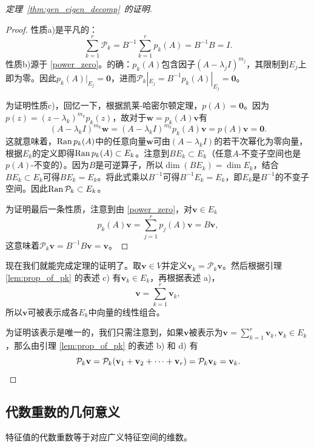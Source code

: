 \begin{proof}[定理~\ref{thm:gen_eigen_decomp}~的证明]
\begin{proof} 
    性质a)是平凡的：\[\sum_{k=1}^r\mathcal{P}_k=B^{-1}\sum_{k=1}^rp_k(A)=B^{-1}B=I.\]
    性质b)源于 \eqref{power_zero}。的确：$p_k(A)$包含因子$(A-\lambda_j I)^{m_j}$，其限制到$E_j$上即为零。因此$p_k(A)|_{E_j}=\mathbf{0}$，进而$\mathcal{P}_k|_{E_j}=B^{-1}p_k(A)|_{E_j}=\mathbf{0}$。

    为证明性质c)，回忆一下，根据凯莱-哈密尔顿定理，$p(A)=\mathbf{0}$。因为$p(z)=(z-\lambda_k)^{m_k}p_k(z)$，故对于$\mathbf{w}=p_k(A)\mathbf{v}$有
    \[(A-\lambda_kI)^{m_k}\mathbf{w}=(A-\lambda_kI)^{m_k}p_k(A)\mathbf{v}=p(A)\mathbf{v}=\mathbf{0}.\]
    这就意味着，$\operatorname{Ran} p_k(A)$中的任意向量$\mathbf{w}$可由$(A-\lambda_k I)$的若干次幂化为零向量，根据$E_k$的定义即得$\operatorname{Ran} p_k(A)\subset E_k$。注意到$BE_k\subset E_k$（任意$A$-不变子空间也是$p(A)$-不变的）。因为$B$是可逆算子，所以$\dim(BE_k)=\dim E_k$，结合$BE_k\subset E_k$可得$BE_k= E_k$。将此式乘以$B^{-1}$可得$B^{-1}E_k=E_k$，即$E_k$是$B^{-1}$的不变子空间。因此$\operatorname{Ran} \mathcal{P}_k\subset E_k$。

    为证明最后一条性质，注意到由 \eqref{power_zero}，对$\mathbf{v}\in E_k$
    \[p_k(A)\mathbf{v}=\sum_{j=1}^{r}p_{j}(A)\mathbf{v}=B\mathbf{v},\]
    这意味着$\mathcal{P}_k\mathbf{v}=B^{-1}B\mathbf{v}=\mathbf{v}$。
\end{proof}

现在我们就能完成定理的证明了。取$\mathbf{v}\in V$并定义$\mathbf{v}_k=\mathcal{P}_k\mathbf{v}$。然后根据引理 \ref{lem:prop_of_pk} 的表述 c) 有$\mathbf{v}_k\in E_k$，再根据表述 a)，\[\mathbf{v}=\sum_{k=1}^{r}\mathbf{v}_k,\]
所以$\mathbf{v}$可被表示成各$E_k$中向量的线性组合。

为证明该表示是唯一的，我们只需注意到，如果$\mathbf{v}$被表示为$\mathbf{v}=\sum_{k=1}^{r}\mathbf{v}_k,\mathbf{v}_k\in E_k$，那么由引理 \ref{lem:prop_of_pk} 的表述 b) 和 d) 有\[\mathcal{P}_k\mathbf{v} = \mathcal{P}_k(\mathbf{v}_1+\mathbf{v}_2+\dots+\mathbf{v}_r)=\mathcal{P}_k\mathbf{v}_k=\mathbf{v}_k.\qedhere\]

\end{proof}

\subsection{代数重数的几何意义}

\begin{proposition}
    特征值的代数重数等于对应广义特征空间的维数。
\end{proposition}

